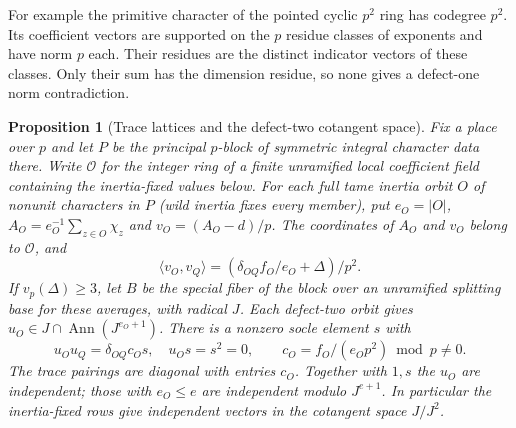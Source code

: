 \documentclass[11pt,a4paper]{article}
\numberwithin{equation}{section}
\newtheorem{proposition}[theorem]{Proposition}
\theoremstyle{remark}
\begin{document}
For example the primitive character of the pointed cyclic $p^2$
ring has codegree $p^2$. Its coefficient vectors are supported on
the $p$ residue classes of exponents and have norm $p$ each. Their
residues are the distinct indicator vectors of these classes. Only
their sum has the dimension residue, so none gives a defect-one
norm contradiction.

\begin{proposition}[Trace lattices and the defect-two cotangent space]\label{fam:M:5.10}
\label{prop:principal-trace-lattice}
\label{prop:principal-fixed-defect-two}\label{cor:defect-two-socle}
Fix a place over $p$ and let $P$ be the principal $p$-block of symmetric
integral character data there. Write $\mathcal O$ for the integer ring
of a finite unramified local coefficient field containing the
inertia-fixed values below. For each full tame inertia orbit $O$ of
nonunit characters in $P$ (wild inertia fixes every member), put
$e_O=|O|$, $A_O=e_O^{-1}\sum_{z\in O}\chi_z$ and $v_O=(A_O-d)/p$.
The coordinates of $A_O$ and $v_O$ belong to $\mathcal O$, and
\begin{equation}\label{eq:principal-orbit-pairing}
 \langle v_O,v_Q\rangle=(\delta_{OQ}f_O/e_O+\Delta)/p^2 .
\end{equation}
If $v_p(\Delta)\ge3$, let $B$ be the special fiber of the block
over an unramified splitting base for these averages, with radical $J$.
Each defect-two orbit gives $u_O\in J\cap\operatorname{Ann}(J^{e_O+1})$.
There is a nonzero socle element $s$ with
\begin{equation}\label{eq:cotangent-products}
 u_Ou_Q=\delta_{OQ}c_Os,\quad u_Os=s^2=0,\qquad
 c_O=f_O/(e_Op^2)\bmod p\ne0 .
\end{equation}
The trace pairings are diagonal with entries $c_O$. Together with
$1,s$ the $u_O$ are independent; those with $e_O\le e$ are independent
modulo $J^{e+1}$. In particular the inertia-fixed rows give independent
vectors in the cotangent space $J/J^2$.
\end{proposition}
\end{document}
